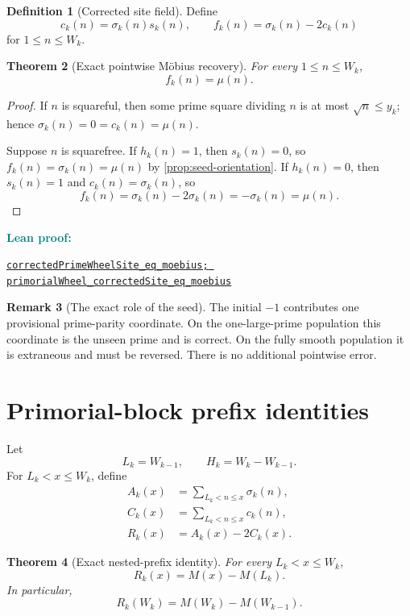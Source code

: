 \documentclass[11pt]{article}
\newtheorem{theorem}{Theorem}[section]
\theoremstyle{definition}
\newtheorem{definition}[theorem]{Definition}
\newtheorem{remark}[theorem]{Remark}
\newcommand{\leanxref}[3]{%
  \par\smallskip
  {\small\noindent\textcolor{teal}{\textbf{#1:}}\par
  \noindent\href{#3}{\nolinkurl{#2}}\par}
  \smallskip
}
\begin{document}
\begin{definition}[Corrected site field]\label{def:corrected-field}
Define
\[
c_k(n)=\sigma_k(n)s_k(n),
\qquad
f_k(n)=\sigma_k(n)-2c_k(n)
\]
for $1\le n\le W_k$.
\end{definition}

\begin{theorem}[Exact pointwise M\"obius recovery]\label{thm:mobius-recovery}
For every $1\le n\le W_k$,
\[
\boxed{f_k(n)=\mu(n).}
\]
\end{theorem}

\begin{proof}
If $n$ is squareful, then some prime square dividing $n$ is at most $\sqrt n\le y_k$; hence $\sigma_k(n)=0=c_k(n)=\mu(n)$.

Suppose $n$ is squarefree.  If $h_k(n)=1$, then $s_k(n)=0$, so $f_k(n)=\sigma_k(n)=\mu(n)$ by \cref{prop:seed-orientation}.  If $h_k(n)=0$, then $s_k(n)=1$ and $c_k(n)=\sigma_k(n)$, so
\[
f_k(n)=\sigma_k(n)-2\sigma_k(n)=-\sigma_k(n)=\mu(n).
\]
\end{proof}
\leanxref{Lean proof}{correctedPrimeWheelSite_eq_moebius; primorialWheel_correctedSite_eq_moebius}{https://github.com/OVVO-Financial/prime-wheel-mobius/blob/main/formalization/RHLean/Arithmetic/PrimeWheelMobiusRecovery.lean}

\begin{remark}[The exact role of the seed]
The initial $-1$ contributes one provisional prime-parity coordinate.  On the one-large-prime population this coordinate is the unseen prime and is correct.  On the fully smooth population it is extraneous and must be reversed.  There is no additional pointwise error.
\end{remark}

\section{Primorial-block prefix identities}

Let
\[
L_k=W_{k-1},
\qquad
H_k=W_k-W_{k-1}.
\]
For $L_k<x\le W_k$, define
\begin{align}
A_k(x)&=\sum_{L_k<n\le x}\sigma_k(n),\label{eq:A-def}\\
C_k(x)&=\sum_{L_k<n\le x}c_k(n),\label{eq:C-def}\\
R_k(x)&=A_k(x)-2C_k(x).\label{eq:R-def}
\end{align}

\begin{theorem}[Exact nested-prefix identity]\label{thm:prefix-identity}
For every $L_k<x\le W_k$,
\[
\boxed{R_k(x)=M(x)-M(L_k).}
\]
In particular,
\[
R_k(W_k)=M(W_k)-M(W_{k-1}).
\]
\end{theorem}
\end{document}

